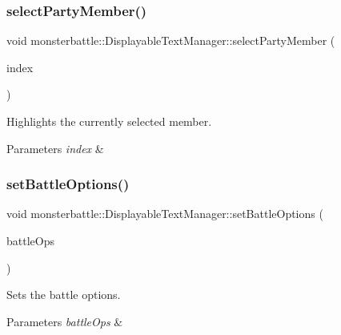 \subsubsection{\texorpdfstring{select\+Party\+Member()}{selectPartyMember()}}
{\footnotesize\ttfamily void monsterbattle\+::\+Displayable\+Text\+Manager\+::select\+Party\+Member (\begin{DoxyParamCaption}\item[{uint8\+\_\+t}]{index }\end{DoxyParamCaption})}



Highlights the currently selected member. 


\begin{DoxyParams}{Parameters}
{\em index} & \\
\hline
\end{DoxyParams}
\mbox{\label{classmonsterbattle_1_1DisplayableTextManager_a1b4eb0b21ebf0b2f2123931cf04a63d9}} 
\subsubsection{\texorpdfstring{set\+Battle\+Options()}{setBattleOptions()}}
{\footnotesize\ttfamily void monsterbattle\+::\+Displayable\+Text\+Manager\+::set\+Battle\+Options (\begin{DoxyParamCaption}\item[{const std\+::array$<$ std\+::string, Game\+::\+Battle\+Options $>$ \&}]{battle\+Ops }\end{DoxyParamCaption})}



Sets the battle options. 


\begin{DoxyParams}{Parameters}
{\em battle\+Ops} & \\
\hline
\end{DoxyParams}
\mbox{\label{classmonsterbattle_1_1DisplayableTextManager_a79f9720047da6253de18072c403997ec}} 
